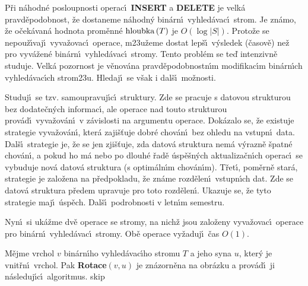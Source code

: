 \flushpar P\v ri n\'ahodn\'e posloupnosti operac\'\i\ {\bf INSERT} a {\bf DELETE} je 
velk\'a pravd\v epodobnost, \v ze dostaneme n\'ahodn\'y bin\'arn\'\i\ 
vy\-hled\'avac\'\i\ strom.  Je zn\'amo, \v ze o\v cek\'avan\'a hodnota prom\v en\-n\'e 
$\operatorname{hloubka}\left(T\right)$ je $O\left(\log|S|\right)$.  Proto\v ze se nepou\v z\'\i vaj\'\i\ vyva\v zovac\'\i\ 
operace, m\accent23u\v zeme dostat lep\v s\'\i\ v\'ysledek (\v casov\v e) ne\v z pro 
vyv\'a\-\v zen\'e bin\'ar\-n\'\i\ vyhled\'avac\'\i\ stromy.  Tento probl\'em se te\v d 
intenzivn\v e studu\-je.  Velk\'a pozornost je v\v enov\'ana 
pravd\v epodobnost\-n\'\i m modifikac\'\i m bin\'arn\'\i ch vyhled\'avac\'\i ch 
strom\accent23u.  Hledaj\'\i\ se v\v sak i dal\v s\'\i\ mo\v znosti.  
\medskip

\flushpar Studuj\'\i\ se tzv.  samoupravuj\'\i c\'\i\ struktury.  Zde se 
pracuje s datovou strukturou bez dodate\v cn\'ych informac\'\i , ale 
operace nad touto strukturou prov\'ad\'\i\ vyva\v zov\'an\'\i\ v z\'avislosti 
na argumentu operace.  Dok\'azalo se, \v ze existuje strategie 
vyva\v zov\'an\'\i , kter\'a zaji\v s\v tuje dobr\'e chov\'an\'\i\ bez ohledu na 
vstupn\'\i\ data.  Dal\v s\'\i\ strategie je, \v ze se jen zji\v s\v tuje, zda datov\'a 
struktura nem\'a v\'yraz\-n\v e \v spatn\'e chov\'an\'\i , a pokud ho m\'a nebo 
po dlouh\'e \v rad\v e \'usp\v e\v s\-n\'ych aktualiza\v cn\'\i ch operac\'\i\ se vybuduje 
nov\'a datov\'a struktura (s optim\'aln\'\i m chov\'an\'\i m).  T\v ret\'\i , 
pom\v ern\v e star\'a, strategie je zalo\-\v ze\-na na p\v redpokladu, \v ze 
zn\'ame rozd\v elen\'\i\ vstupn\'\i ch dat.  Zde se datov\'a struktura 
p\v redem upravuje pro toto rozd\v elen\'\i .  Ukazuje se, \v ze tyto 
strategie maj\'\i\ \'usp\v ech.  Dal\v s\'\i\ podrobnosti v letn\'\i m semestru.  
\medskip

\flushpar Nyn\'\i\ si uk\'a\v zme dv\v e operace se stromy, na nich\v z jsou 
zalo\v zeny  vyva\v zovac\'\i\ operace pro bin\'arn\'\i\ vyhled\'avac\'\i\ 
stromy. Ob\v e ope\-race vy\v zaduj\'\i\ \v cas $O\left(1\right)$.
\medskip

\flushpar M\v ejme vrchol $v$ bin\'arn\'\i ho vyhled\'avac\'\i ho stromu $
T$ a 
jeho syna $u$, kter\'y je vnit\v rn\'\i\ vrchol.  Pak {\bf Rotace$
\left(v,u\right)$} je 
zn\'azorn\v ena na obr\'azku a prov\'ad\'\i\ ji n\'asleduj\'\i c\'\i\ algoritmus.  
skip

\midinsert
\centerline{}
\endcaption
\endinsert
\medskip

